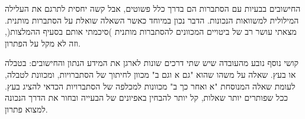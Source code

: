החישובים בבעיות עם הסתברות הם בדרך כלל פשוטים, אבל קשה יחסית לתרגם את העלילה המילולית למשוואות הנכונות. הדבר נכון במיוחד כאשר השאלה שואלת על הסתברות מותנית. מצאתי עושר רב של ביטויים המכוונים להסתברות מותנית )סיכמתי אותם בסעיף ההמלצות(, וזה לא מקל על הפתרון.

קושי נוסף נובע מהעובדה שיש שתי דרכים שונות לארגן את המידע הנתון והחישובים: בטבלה או בעץ. שאלה על משהו שהוא "גם א וגם ב" מכוון לחיתוך של הסתברויות, ומכוונת לטבלה, לעומת שאלה המנוסחת "א ואחר כך ב" מכוונות למכלפה של הסתברויות הכדאי להציג בעץ. ככל שפותרים יותר שאלות, 
קל יותר להבחין באפיונים של הבעייה ובחור את הדרך הנכונה למצוא פתרון.

\np
\mbox{}
\np
